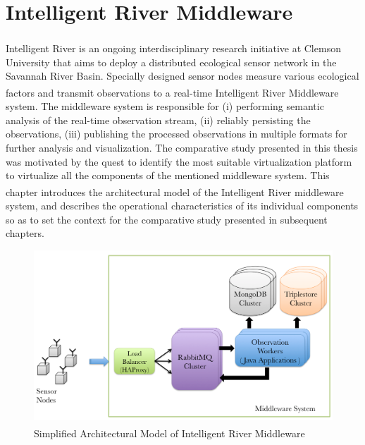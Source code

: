 \chapter{Intelligent River\textsuperscript{\textregistered} Middleware}


Intelligent River\textsuperscript{\textregistered} is an ongoing interdisciplinary research initiative at Clemson University that aims to deploy a distributed ecological sensor network in the Savannah River Basin. Specially designed sensor nodes measure various ecological factors and transmit observations to a real-time Intelligent River\textsuperscript{\textregistered} Middleware system. The middleware system is responsible for (i) performing semantic analysis of the real-time observation stream, (ii) reliably persisting the observations, (iii) publishing the processed observations in multiple formats for further analysis and visualization. The comparative study presented in this thesis was motivated by the quest to identify the most suitable virtualization platform to virtualize all the components of the mentioned middleware system. This chapter introduces the architectural model of the Intelligent River\textsuperscript{\textregistered} middleware system, and describes the operational characteristics of its individual components so as to set the context for the comparative study presented in subsequent chapters.

\begin{figure}[htbp]
\centering
\includegraphics[width=130mm]{ir.png}
\caption{Simplified Architectural Model of Intelligent River\textsuperscript{\textregistered} Middleware }
\label{fig:ir}
\end{figure}


